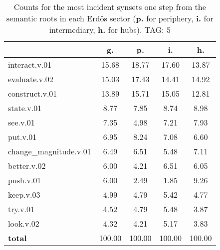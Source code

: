 \begin{table}[h!]
\begin{center}
\begin{tabular}{| l || c | c | c | c |}\hline
 & {\bf g.} & {\bf p.} & {\bf i.} & {\bf h.} \\\hline\hline
interact.v.01 & 15.68  & 18.77  & 17.60  & 13.87 \\\hline
evaluate.v.02 & 15.03  & 17.43  & 14.41  & 14.92 \\\hline
construct.v.01 & 13.89  & 15.71  & 15.05  & 12.81 \\\hline
state.v.01 & 8.77  & 7.85  & 8.74  & 8.98 \\\hline
see.v.01 & 7.35  & 4.98  & 7.21  & 7.93 \\\hline
put.v.01 & 6.95  & 8.24  & 7.08  & 6.60 \\\hline
change\_magnitude.v.01 & 6.49  & 6.51  & 5.48  & 7.11 \\\hline
better.v.02 & 6.00  & 4.21  & 6.51  & 6.05 \\\hline
push.v.01 & 6.00  & 2.49  & 1.85  & 9.26 \\\hline
keep.v.03 & 4.99  & 4.79  & 5.42  & 4.77 \\\hline
try.v.01 & 4.52  & 4.79  & 5.48  & 3.87 \\\hline
look.v.02 & 4.32  & 4.21  & 5.17  & 3.83 \\\hline\hline
{{\bf total}} & 100.00  & 100.00  & 100.00  & 100.00 \\\hline
\end{tabular}
\caption{Counts for the most incident synsets one step from the semantic roots in each Erd\"os sector ({\bf p.} for periphery, {\bf i.} for intermediary, {\bf h.} for hubs). TAG: 5}
\end{center}
\end{table}